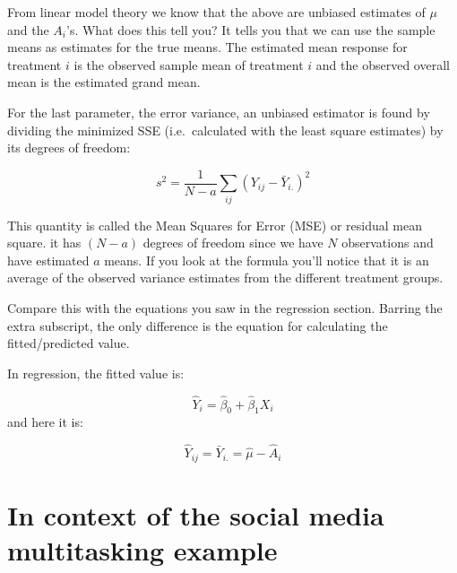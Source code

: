 \documentclass[
  letterpaper,
  DIV=11,
  numbers=noendperiod,
  oneside]{scrreprt}
\begin{document}
From linear model theory we know that the above are unbiased
estimates of \(\mu\) and the
\(A_i\)'s. What does this tell you? It tells you that we can use the
sample means as estimates for the true means. The estimated mean
response for treatment \(i\) is the observed sample mean of treatment
\(i\) and the observed overall mean is the estimated grand mean.

For the last parameter, the error variance, an unbiased estimator is
found by dividing the minimized SSE (i.e.~calculated with the least
square estimates) by its degrees of freedom:

\[ s^2 = \frac{1}{N-a}\sum_{ij}(Y_{ij} - \bar{Y}_{i.})^2 \]

This quantity is called the Mean Squares for Error (MSE) or residual
mean square. it has \((N-a)\) degrees of freedom since we have \(N\)
observations and have estimated \(a\) means. If you look at the formula
you'll notice that it is an average of the observed variance estimates
from the different treatment groups.

\begin{tcolorbox}[enhanced jigsaw, colframe=quarto-callout-caution-color-frame, breakable, arc=.35mm, toptitle=1mm, colback=white, title={Compare this with regression}, opacityback=0, bottomrule=.15mm, opacitybacktitle=0.6, colbacktitle=quarto-callout-caution-color!10!white, toprule=.15mm, rightrule=.15mm, bottomtitle=1mm, leftrule=.75mm, titlerule=0mm, coltitle=black, left=2mm]

Compare this with the equations you saw in the regression section.
Barring the extra subscript, the only difference is the equation for
calculating the fitted/predicted value.

In regression, the fitted value is:

\[ \hat{Y}_i = \hat{\beta}_0 + \hat{\beta}_1X_i \] and here it is:

\[ \hat{Y}_{ij} = \bar{Y}_{i.} = \hat{\mu} - \hat{A}_i \]

\end{tcolorbox}

\section{In context of the social media multitasking
example}\label{in-context-of-the-social-media-multitasking-example}
\end{document}
